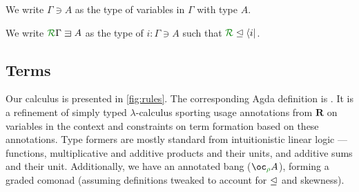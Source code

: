 \documentclass[submission,copyright,creativecommons]{eptcs}
\begin{document}
\begin{definition}
  We write $\Gamma \ni A$ as the type of variables in $\Gamma$ with type $A$.
\end{definition}

\begin{definition}
  We write $\ctx{\Gamma}{R} \lvar A$ as the type of $i : \Gamma \ni A$ such that
  $\resctx R \subres \langle i \rvert$.
\end{definition}

\subsection{Terms}

Our calculus is presented in \autoref{fig:rules}.
The corresponding Agda definition is .
It is a refinement of simply typed $\lambda$-calculus sporting usage annotations
from $\mathbf R$ on variables in the context and constraints on term formation
based on these annotations.
Type formers are mostly standard from intuitionistic linear logic --- functions,
multiplicative and additive products and their units, and additive sums and
their unit.
Additionally, we have an annotated bang ($\excl{\rho}{A}$), forming a graded
comonad (assuming definitions tweaked to account for $\trianglelefteq$ and skewness).
\end{document}
